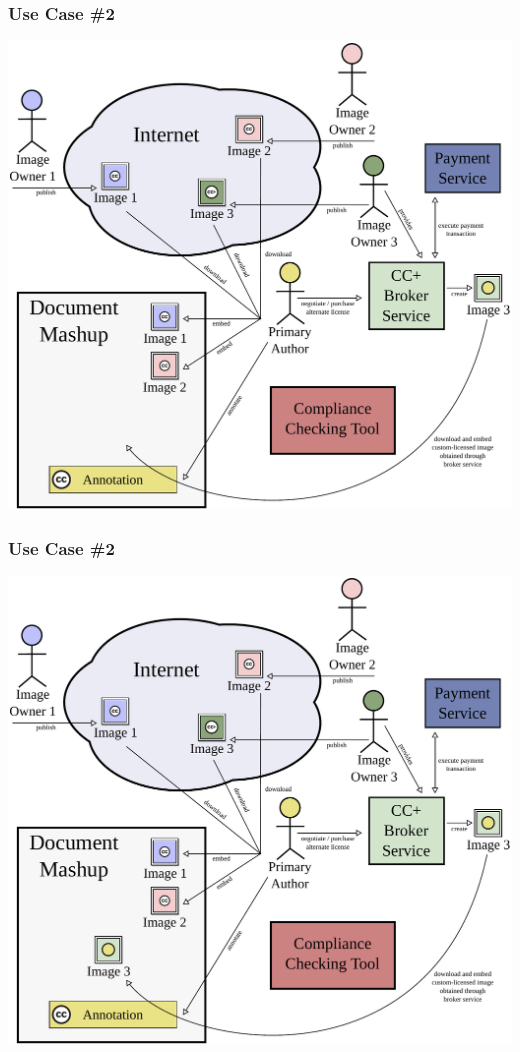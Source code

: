 \documentclass[mathserif,xcolor=dvipsnames,hyperref={bookmarks=true}]{beamer}
\begin{document}
    \begin{frame}[t]
        \frametitle{Use Case \#2}
        \begin{center}
            \includegraphics[width=0.9\textheight]{../resources/usecases/usecase2/usecase2-step36.pdf}
        \end{center}
    \end{frame}
    \begin{frame}[t]
        \frametitle{Use Case \#2}
        \begin{center}
            \includegraphics[width=0.9\textheight]{../resources/usecases/usecase2/usecase2-step37.pdf}
        \end{center}
    \end{frame}
\end{document}
